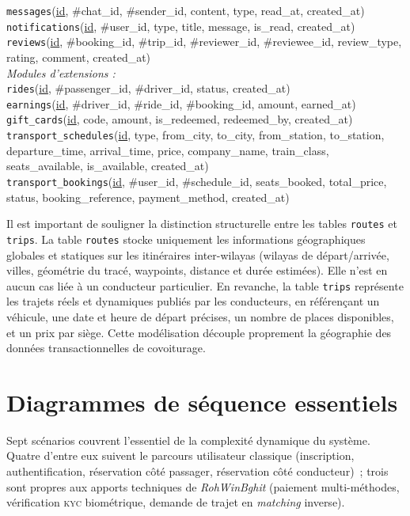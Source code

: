 \documentclass[12pt, a4paper, oneside]{report}
\begin{document}
\begin{highlight}[breakable=false]
\texttt{messages}(\underline{id}, \#chat\_id, \#sender\_id, content, type, read\_at, created\_at)\\[1pt]
\texttt{notifications}(\underline{id}, \#user\_id, type, title, message, is\_read, created\_at)\\[1pt]
\texttt{reviews}(\underline{id}, \#booking\_id, \#trip\_id, \#reviewer\_id, \#reviewee\_id, review\_type, rating, comment, created\_at)\\[1pt]
\textit{Modules d'extensions :}\\[1pt]
\texttt{rides}(\underline{id}, \#passenger\_id, \#driver\_id, status, created\_at)\\[1pt]
\texttt{earnings}(\underline{id}, \#driver\_id, \#ride\_id, \#booking\_id, amount, earned\_at)\\[1pt]
\texttt{gift\_cards}(\underline{id}, code, amount, is\_redeemed, redeemed\_by, created\_at)\\[1pt]
\texttt{transport\_schedules}(\underline{id}, type, from\_city, to\_city, from\_station, to\_station, departure\_time, arrival\_time, price, company\_name, train\_class, seats\_available, is\_available, created\_at)\\[1pt]
\texttt{transport\_bookings}(\underline{id}, \#user\_id, \#schedule\_id, seats\_booked, total\_price, status, booking\_reference, payment\_method, created\_at)
\end{highlight}

Il est important de souligner la distinction structurelle entre les tables \texttt{routes} et \texttt{trips}. La table \texttt{routes} stocke uniquement les informations géographiques globales et statiques sur les itinéraires inter-wilayas (wilayas de départ/arrivée, villes, géométrie du tracé, waypoints, distance et durée estimées). Elle n'est en aucun cas liée à un conducteur particulier. En revanche, la table \texttt{trips} représente les trajets réels et dynamiques publiés par les conducteurs, en référençant un véhicule, une date et heure de départ précises, un nombre de places disponibles, et un prix par siège. Cette modélisation découple proprement la géographie des données transactionnelles de covoiturage.


\section{Diagrammes de séquence essentiels}
\label{sec:sequences}

Sept scénarios couvrent l'essentiel de la complexité dynamique du système. Quatre d'entre eux suivent le parcours utilisateur classique (inscription, authentification, réservation côté passager, réservation côté conducteur)~; trois sont propres aux apports techniques de \textit{RohWinBghit} (paiement multi-méthodes, vérification \textsc{kyc} biométrique, demande de trajet en \textit{matching} inverse).
\end{document}
